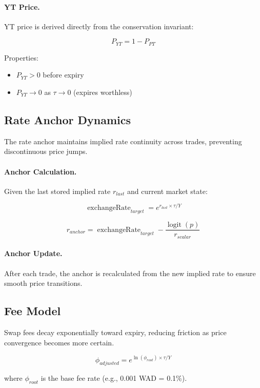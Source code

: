\paragraph{YT Price.}

YT price is derived directly from the conservation invariant:

\[
P_{YT} = 1 - P_{PT}
\]

Properties:
\begin{itemize}
    \item $P_{YT} > 0$ before expiry
    \item $P_{YT} \to 0$ as $\tau \to 0$ (expires worthless)
\end{itemize}

\subsection{Rate Anchor Dynamics}

The rate anchor maintains implied rate continuity across trades, preventing discontinuous price jumps.

\paragraph{Anchor Calculation.}

Given the last stored implied rate $r_{last}$ and current market state:

\[
\operatorname{exchangeRate}_{target} = e^{r_{last} \times \tau / Y}
\]

\[
r_{anchor} = \operatorname{exchangeRate}_{target} - \frac{\operatorname{logit}(p)}{r_{scalar}}
\]

\paragraph{Anchor Update.}

After each trade, the anchor is recalculated from the new implied rate to ensure smooth price transitions.

\subsection{Fee Model}

Swap fees decay exponentially toward expiry, reducing friction as price convergence becomes more certain.

\[
\phi_{adjusted} = e^{\ln(\phi_{root}) \times \tau / Y}
\]

where $\phi_{root}$ is the base fee rate (e.g., 0.001 WAD = 0.1\%).

